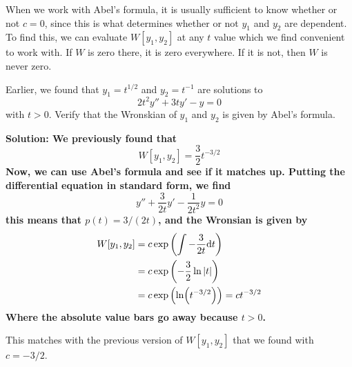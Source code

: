 When we work with Abel's formula, it is usually sufficient to know whether or not $c=0$, since this is what determines whether or not $y_1$ and $y_2$ are dependent. To find this, we can evaluate $W[y_1, y_2]$ at any $t$ value which we find convenient to work with. If $W$ is zero there, it is zero everywhere. If it is not, then $W$ is never zero.
\begin{example}
    Earlier, we found that $y_1 = t^{1/2}$ and $y_2 = t^{-1}$ are solutions to
    \[ 2t^2y'' + 3ty' - y  = 0 \]
    with $t>0$. Verify that the Wronskian of $y_1$ and $y_2$ is given by Abel's formula. \par
    \bf{Solution:}  We previously found that 
    \[ W[y_1, y_2] = \frac{3}{2}t^{-3/2} \]
    Now, we can use Abel's formula and see if it matches up. Putting the differential equation in standard form, we find
    \[ y'' + \frac{3}{2t} y' - \frac{1}{2t^2}y = 0 \]
    this means that $p(t) = 3/(2t)$, and the Wronsian is given by
    \begin{align*}
        W[y_1, y_2] &= c \exp\pqty{\int -\frac{3}{2t}\dd t} \\
        &= c\exp \pqty{-\frac{3}{2}\ln\abs{t}} \\
        &= c\exp \pqty{\ln (t^{-3/2})} = ct^{-3/2}
    \end{align*}
    Where the absolute value bars go away because $t>0$. \par
    This matches with the previous version of $W[y_1, y_2]$ that we found with $c = -3/2$.
\end{example}
